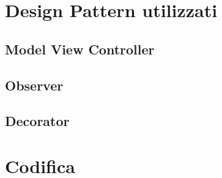 \section{Design Pattern utilizzati}\label{sec:design-pattern-utilizzati}
\subsection{Model View Controller}\label{subsec:model-view-controller}
\subsection{Observer}\label{subsec:observer}
\subsection{Decorator}\label{subsec:decorator}
\section{Codifica}\label{sec:codifica}
